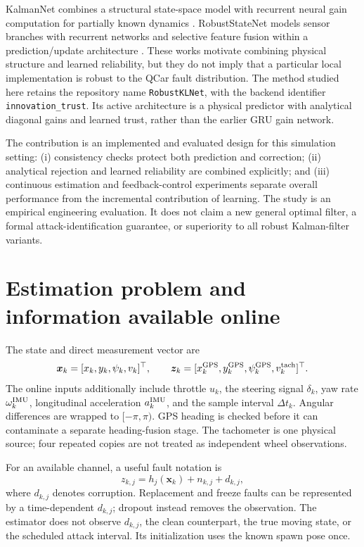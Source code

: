 ﻿\documentclass[10pt,a4paper]{article}
\newcommand{\vx}{\bm{x}}
\newcommand{\vz}{\bm{z}}
\begin{document}
KalmanNet combines a structural state-space model with recurrent neural gain computation
for partially known dynamics \cite{revach2022}.
RobustStateNet models sensor branches with recurrent networks and selective feature fusion
within a prediction/update architecture \cite{dahal2024}.
These works motivate combining physical structure and learned reliability, but they do not
imply that a particular local implementation is robust to the QCar fault distribution.
The method studied here retains the repository name \texttt{RobustKLNet}, with the
backend identifier \texttt{innovation\_trust}. Its active architecture is a physical
predictor with analytical diagonal gains and learned trust, rather than the earlier
GRU gain network.

The contribution is an implemented and evaluated design for this simulation setting:
(i) consistency checks protect both prediction and correction;
(ii) analytical rejection and learned reliability are combined explicitly;
and (iii) continuous estimation and feedback-control experiments separate overall
performance from the incremental contribution of learning.
The study is an empirical engineering evaluation. It does not claim a new general
optimal filter, a formal attack-identification guarantee, or superiority to all robust
Kalman-filter variants.

\section{Estimation problem and information available online}
The state and direct measurement vector are
\begin{equation}
 \vx_k=[x_k,y_k,\psi_k,v_k]^\top,\qquad
 \vz_k=[x_k^{\rm GPS},y_k^{\rm GPS},\psi_k^{\rm GPS},v_k^{\rm tach}]^\top .
 \label{eq:state}
\end{equation}
The online inputs additionally include throttle $u_k$, the steering signal $\delta_k$,
yaw rate $\omega_k^{\rm IMU}$, longitudinal acceleration $a_k^{\rm IMU}$, and the
sample interval $\Delta t_k$. Angular differences are wrapped to $[-\pi,\pi)$.
GPS heading is checked before it can contaminate a separate heading-fusion stage.
The tachometer is one physical source; four repeated copies are not treated as
independent wheel observations.

For an available channel, a useful fault notation is
\begin{equation}
 z_{k,j}=h_j(\vx_k)+n_{k,j}+d_{k,j},
 \label{eq:corruption}
\end{equation}
where $d_{k,j}$ denotes corruption. Replacement and freeze faults can be represented
by a time-dependent $d_{k,j}$; dropout instead removes the observation.
The estimator does not observe $d_{k,j}$, the clean counterpart, the true moving state,
or the scheduled attack interval. Its initialization uses the known spawn pose once.
\end{document}

